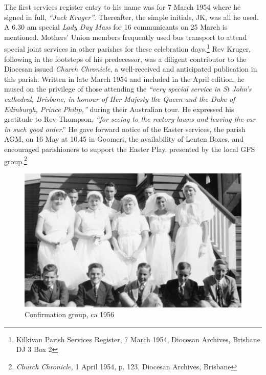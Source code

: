 The first services register entry to his name was for 7 March 1954 where he signed in full, \emph{``Jack Kruger''}. Thereafter, the simple initials, JK, was all he used. A 6.30 am special \emph{Lady Day Mass} for 16 communicants on 25 March is mentioned. Mothers' Union members frequently used bus transport to attend special joint services in other parishes for these celebration days.\footnote{Kilkivan Parish Services Register, 7 March 1954, Diocesan Archives, Brisbane DJ 3 Box 2} Rev Kruger, following in the footsteps of his predecessor, was a diligent contributor to the Diocesan issued \emph{Church Chronicle}, a well-received and anticipated publication in this parish. Written in late March 1954 and included in the April edition, he mused on the privilege of those attending the \emph{``very special service in St John's cathedral, Brisbane, in honour of Her Majesty the Queen and the Duke of Edinburgh, Prince Philip,''} during their Australian tour. He expressed his gratitude to Rev Thompson, \emph{``for seeing to the rectory lawns and leaving the car in such good order}.'' He gave forward notice of the Easter services, the parish AGM, on 16 May at 10.45 in Goomeri, the availability of Lenten Boxes, and encouraged parishioners to support the Easter Play, presented by the local GFS group.\footnote{\emph{Church Chronicle,} 1 April 1954, p. 123, Diocesan Archives, Brisbane}








\begin{figure}[!htb]
\begin{center}
\includegraphics[width=1.\textwidth,center]{../images/confirmation1956.jpg}
\caption{Confirmation group, ca 1956}
\end{center}
\end{figure}




